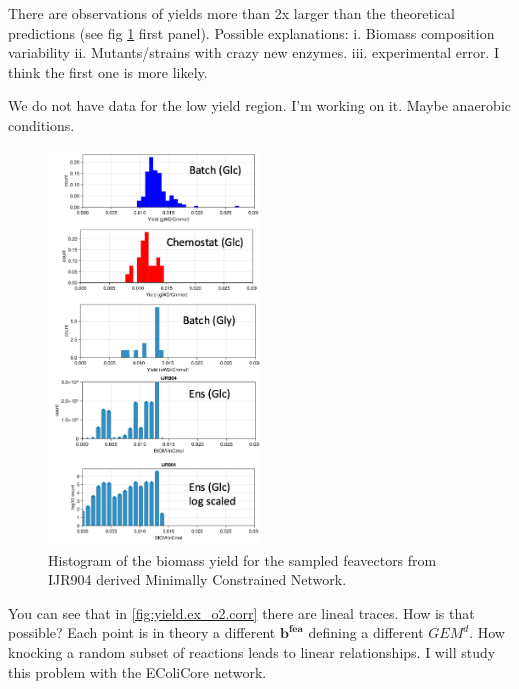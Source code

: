 \documentclass[11pt, letterpaper]{article}
\newcommand{\vecsym}[1]{\boldsymbol{#1}}
\begin{document}
\begin{issue-box}[]
   \label{issue:yield.hist.1}
   There are observations of yields more than 2x larger than the theoretical predictions (see fig \ref{fig:yield.hist} first panel).
   Possible explanations: i. Biomass composition variability ii. Mutants/strains with crazy new enzymes. iii. experimental error.
   I think the first one is more likely.
\end{issue-box}


\begin{issue-box}[]
   \label{issue:yield.hist.2}
   We do not have data for the low yield region.
   I'm working on it. Maybe anaerobic conditions.
\end{issue-box}


\begin{figure}[h!]
   \centering
   \includegraphics[width=0.5\textwidth]{images/yield_hist.png}
   \caption{
       Histogram of the biomass yield for the sampled feavectors from IJR904 derived Minimally Constrained Network.
   }
   \label{fig:yield.hist}
\end{figure}


\begin{issue-box}[]
   \label{issue:yield.ex_o2.corr}
   You can see that in \ref{fig:yield.ex_o2.corr} there are lineal traces.
   How is that possible? Each point is in theory a different $\vecsym{b^{fea}}$ defining a different $GEM^{d}$.
   How knocking a random subset of reactions leads to linear relationships.
   I will study this problem with the EColiCore network.
\end{issue-box}
\end{document}
